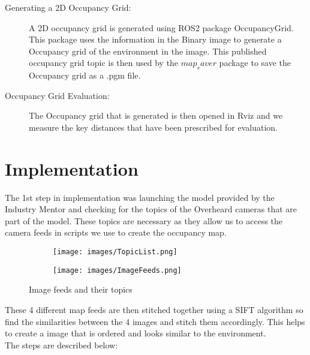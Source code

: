\documentclass{josis}
\begin{document}
\begin{description}
    
    \item[Generating a 2D Occupancy Grid:] A 2D occupancy grid is generated using ROS2 package OccupancyGrid. This package uses the information in the Binary image to generate a Occupancy grid of the environment in the image. This published occupancy grid topic is then used by the $map_saver$ package to save the Occupancy grid as a .pgm file.
    \item[Occupancy Grid Evaluation:] The Occupancy grid that is generated is then opened in Rviz and we measure the key distances that have been prescribed for evaluation.

\end{description} 
\pagebreak
\section{Implementation}
The 1st step in implementation was launching the model provided by the Industry Mentor and checking for the topics of the Overheard cameras that are part of the model. These topics are necessary as they allow us to access the camera feeds in scripts we use to create the occupancy map.
\begin{figure}[h]
    \centering
    
    \begin{subfigure}[b]{0.45\textwidth}
        \centering
        \texttt{[image: images/TopicList.png]}
        
        \label{fig:subfig1}
    \end{subfigure}
    \hfill
    \begin{subfigure}[b]{0.45\textwidth}
        \centering
        \texttt{[image: images/ImageFeeds.png]}

        \label{fig:subfig2}
    \end{subfigure}
    
    \caption{Image feeds and their topics}
    \label{fig:mainfig}
\end{figure}
These 4 different map feeds are then stitched together using a SIFT algorithm so find the similarities between the 4 images and stitch them accordingly. This helps to create a image that is ordered and looks similar to the environment.\\
The steps are described below:
\end{document}
